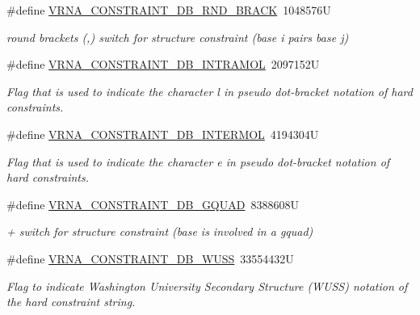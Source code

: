 \begin{DoxyCompactItemize}
\#define \mbox{\hyperlink{group__hard__constraints_gac17b034852c914bc5879954c65d7e74b}{V\+R\+N\+A\+\_\+\+C\+O\+N\+S\+T\+R\+A\+I\+N\+T\+\_\+\+D\+B\+\_\+\+R\+N\+D\+\_\+\+B\+R\+A\+CK}}~1048576U
\begin{DoxyCompactList}\small\item\em round brackets \textquotesingle{}(\textquotesingle{},\textquotesingle{})\textquotesingle{} switch for structure constraint (base i pairs base j) \end{DoxyCompactList}\item 
\#define \mbox{\hyperlink{group__hard__constraints_ga5c17253f5a39d1d49b0fb11f5196982a}{V\+R\+N\+A\+\_\+\+C\+O\+N\+S\+T\+R\+A\+I\+N\+T\+\_\+\+D\+B\+\_\+\+I\+N\+T\+R\+A\+M\+OL}}~2097152U
\begin{DoxyCompactList}\small\item\em Flag that is used to indicate the character \textquotesingle{}l\textquotesingle{} in pseudo dot-\/bracket notation of hard constraints. \end{DoxyCompactList}\item 
\#define \mbox{\hyperlink{group__hard__constraints_ga31d0ebb9755ca8a4acafc14f00ca755d}{V\+R\+N\+A\+\_\+\+C\+O\+N\+S\+T\+R\+A\+I\+N\+T\+\_\+\+D\+B\+\_\+\+I\+N\+T\+E\+R\+M\+OL}}~4194304U
\begin{DoxyCompactList}\small\item\em Flag that is used to indicate the character \textquotesingle{}e\textquotesingle{} in pseudo dot-\/bracket notation of hard constraints. \end{DoxyCompactList}\item 
\#define \mbox{\hyperlink{group__hard__constraints_ga75cfab03cdc97c95b3ce8bb29f52b08e}{V\+R\+N\+A\+\_\+\+C\+O\+N\+S\+T\+R\+A\+I\+N\+T\+\_\+\+D\+B\+\_\+\+G\+Q\+U\+AD}}~8388608U
\begin{DoxyCompactList}\small\item\em \textquotesingle{}+\textquotesingle{} switch for structure constraint (base is involved in a gquad) \end{DoxyCompactList}\item 
\#define \mbox{\hyperlink{group__hard__constraints_ga10ce6bd2355945f3c8161b7a30a2c322}{V\+R\+N\+A\+\_\+\+C\+O\+N\+S\+T\+R\+A\+I\+N\+T\+\_\+\+D\+B\+\_\+\+W\+U\+SS}}~33554432U
\begin{DoxyCompactList}\small\item\em Flag to indicate Washington University Secondary Structure (W\+U\+SS) notation of the hard constraint string. \end{DoxyCompactList}\item 

\end{DoxyCompactItemize}
